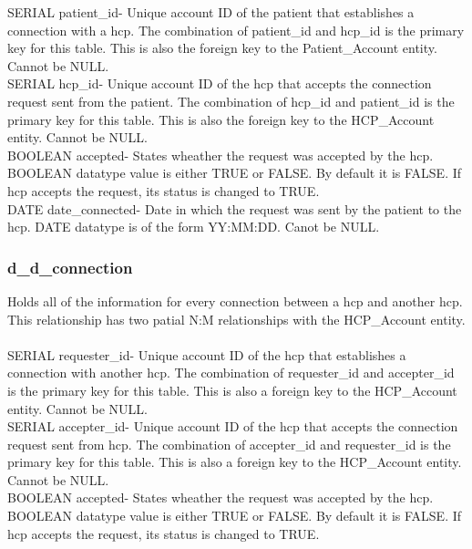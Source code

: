 \documentclass[12pt]{report}
\begin{document}
SERIAL patient\_id- Unique account ID of the patient that establishes a connection with a hcp.  The combination of patient\_id and hcp\_id is the primary key for this table.  This is also the foreign key to the Patient\_Account entity.  Cannot be NULL.\\  

SERIAL hcp\_id- Unique account ID of the hcp that accepts the connection request sent from the patient.  The combination of hcp\_id and patient\_id is the primary key for this table.  This is also the foreign key to the HCP\_Account entity.  Cannot be NULL.\\

BOOLEAN accepted- States wheather the request was accepted by the hcp.  BOOLEAN datatype value is either TRUE or FALSE.  By default it is FALSE.  If hcp accepts the request, its status is changed to TRUE.\\

DATE date\_connected- Date in which the request was sent by the patient to the hcp.  DATE datatype is of the form YY:MM:DD.  Canot be NULL.\\

\subsubsection{d\_d\_connection}
Holds all of the information for every connection between a hcp and another hcp.  This relationship has two patial N:M relationships with the HCP\_Account entity.\\ \\

SERIAL requester\_id- Unique account ID of the hcp that establishes a connection with another hcp.  The combination of requester\_id and accepter\_id is the primary key for this table.  This is also a foreign key to the HCP\_Account entity.  Cannot be NULL.\\  

SERIAL accepter\_id- Unique account ID of the hcp that accepts the connection request sent from hcp.  The combination of accepter\_id and requester\_id is the primary key for this table.  This is also a foreign key to the HCP\_Account entity.  Cannot be NULL.\\

BOOLEAN accepted- States wheather the request was accepted by the hcp.  BOOLEAN datatype value is either TRUE or FALSE.  By default it is FALSE.  If hcp accepts the request, its status is changed to TRUE.\\
\end{document}
